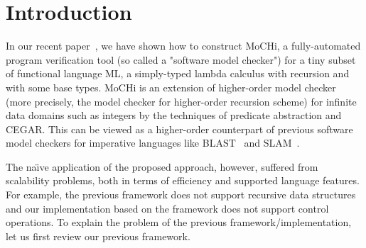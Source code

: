 \section{Introduction}
\label{sec:intro}

In our recent paper~\cite{KobayashiPLDI2011}, we have shown how to
construct MoCHi, a fully-automated program verification tool (so called a
"software model checker") for a tiny subset of functional language ML, a
simply-typed lambda calculus with recursion and with some base types.
MoCHi is an extension of higher-order model checker
(more precisely, the model checker for higher-order recursion scheme)
for infinite data domains such as integers by the techniques of
predicate abstraction and CEGAR.  This can be viewed as a higher-order
counterpart of previous software model checkers for imperative languages
like BLAST~\cite{Henzinger2002} and SLAM~\cite{Ball2002}.

The na\"{\i}ve application of the proposed approach, however, suffered
from scalability problems, both in terms of efficiency and supported
language features. For example, the previous framework does not support
recursive data structures and our implementation based on the framework
does not support control operations.  To explain the problem of the
previous framework/implementation, let us first review our previous
framework.

